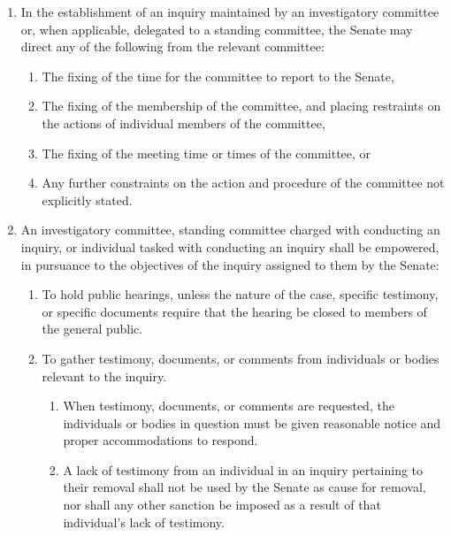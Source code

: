 \begin{enumerate}
\begin{enumerate}
\begin{enumerate}
    \item If an investigatory committee does not have a chair, the Grand Marshal may appoint one without need for confirmation by the Senate as a whole, unless an appointment by the Grand Marshal is formally objected to by two or more Senators, in which case the appointment shall follow the standard nomination process.
    \end{enumerate}
  \end{enumerate}
\item In the establishment of an inquiry maintained by an investigatory committee or, when applicable, delegated to a standing committee, the Senate may direct any of the following from the relevant committee:
  \begin{enumerate}
  \item The fixing of the time for the committee to report to the Senate,
  \item The fixing of the membership of the committee, and placing restraints on the actions of individual members of the committee,
  \item The fixing of the meeting time or times of the committee, or
  \item Any further constraints on the action and procedure of the committee not explicitly stated.
  \end{enumerate}
\item An investigatory committee, standing committee charged with conducting an inquiry, or individual tasked with conducting an inquiry shall be empowered, in pursuance to the objectives of the inquiry assigned to them by the Senate:
  \begin{enumerate}
  \item To hold public hearings, unless the nature of the case, specific testimony, or specific documents require that the hearing be closed to members of the general public.
  \item To gather testimony, documents, or comments from individuals or bodies relevant to the inquiry.
    \begin{enumerate}
    \item When testimony, documents, or comments are requested, the individuals or bodies in question must be given reasonable notice and proper accommodations to respond.
    \item A lack of testimony from an individual in an inquiry pertaining to their removal shall not be used by the Senate as cause for removal, nor shall any other sanction be imposed as a result of that individual's lack of testimony.

\end{enumerate}
\end{enumerate}
\end{enumerate}
